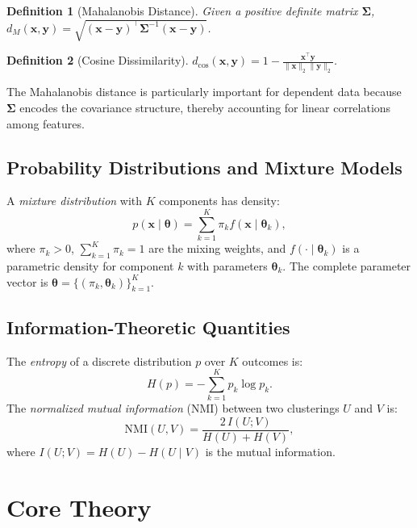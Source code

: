 \documentclass[conference]{IEEEtran}
\newtheorem{definition}{Definition}
\begin{document}
\begin{definition}[Mahalanobis Distance]
Given a positive definite matrix $\mathbf{\Sigma}$,
$d_M(\mathbf{x}, \mathbf{y}) = \sqrt{(\mathbf{x}-\mathbf{y})^\top \mathbf{\Sigma}^{-1} (\mathbf{x}-\mathbf{y})}$.
\end{definition}

\begin{definition}[Cosine Dissimilarity]
$d_{\cos}(\mathbf{x}, \mathbf{y}) = 1 - \frac{\mathbf{x}^\top \mathbf{y}}{\|\mathbf{x}\|_2 \|\mathbf{y}\|_2}$.
\end{definition}

The Mahalanobis distance is particularly important for dependent data because $\mathbf{\Sigma}$ encodes the covariance structure, thereby accounting for linear correlations among features.

\subsection{Probability Distributions and Mixture Models}

A \emph{mixture distribution} with $K$ components has density:
\begin{equation}
p(\mathbf{x} \mid \boldsymbol{\theta}) = \sum_{k=1}^K \pi_k f(\mathbf{x} \mid \boldsymbol{\theta}_k),
\label{eq:mixture}
\end{equation}
where $\pi_k > 0$, $\sum_{k=1}^K \pi_k = 1$ are the mixing weights, and $f(\cdot \mid \boldsymbol{\theta}_k)$ is a parametric density for component $k$ with parameters $\boldsymbol{\theta}_k$. The complete parameter vector is $\boldsymbol{\theta} = \{(\pi_k, \boldsymbol{\theta}_k)\}_{k=1}^K$.

\subsection{Information-Theoretic Quantities}

The \emph{entropy} of a discrete distribution $p$ over $K$ outcomes is:
\[
H(p) = -\sum_{k=1}^K p_k \log p_k.
\]
The \emph{normalized mutual information} (NMI) between two clusterings $U$ and $V$ is:
\begin{equation}
\mathrm{NMI}(U, V) = \frac{2 \, I(U; V)}{H(U) + H(V)},
\label{eq:nmi}
\end{equation}
where $I(U;V) = H(U) - H(U \mid V)$ is the mutual information.

\section{Core Theory}
\label{sec:theory}
\end{document}
